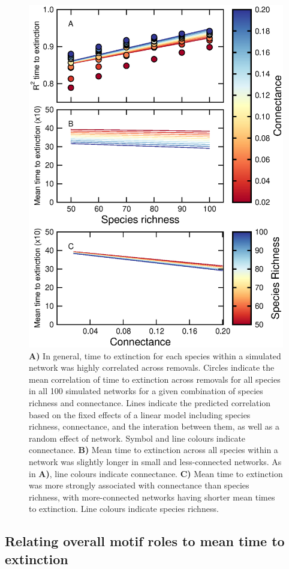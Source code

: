 \documentclass[12pt]{article}
\begin{document}
		\begin{figure}[hb!]
			\caption{\textbf{A)} In general, time to extinction for each species within a simulated network was highly correlated across removals. Circles indicate the mean correlation of time to extinction across removals for all species in all 100 simulated networks for a given combination of species richness and connectance. Lines indicate the predicted correlation based on the fixed effects of a linear model including species richness, connectance, and the interation between them, as well as a random effect of network. Symbol and line colours indicate connectance. \textbf{B)} Mean time to extinction across all species within a network was slightly longer in small and less-connected networks. As in \textbf{A)}, line colours indicate connectance. \textbf{C)} Mean time to extinction was more strongly associated with connectance than species richness, with more-connected networks having shorter mean times to extinction. Line colours indicate species richness.}
			\label{extorder_corrs}
			\includegraphics[width=.75\textwidth]{figures/extinction_order/extorder_correlations.eps}
			\end{figure}

    \subsection*{Relating overall motif roles to mean time to extinction}
    
\end{document}
